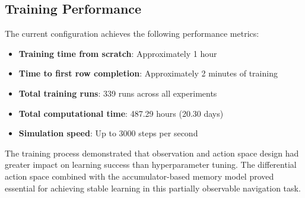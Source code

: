 \documentclass[11pt,a4paper,twocolumn]{article}
\begin{document}
\subsection{Training Performance}
The current configuration achieves the following performance metrics:
\begin{itemize}
    \item \textbf{Training time from scratch}: Approximately 1 hour
    \item \textbf{Time to first row completion}: Approximately 2 minutes of training
    \item \textbf{Total training runs}: 339 runs across all experiments
    \item \textbf{Total computational time}: 487.29 hours (20.30 days)
    \item \textbf{Simulation speed}: Up to 3000 steps per second
\end{itemize}

The training process demonstrated that observation and action space design had greater impact on learning success than hyperparameter tuning. The differential action space combined with the accumulator-based memory model proved essential for achieving stable learning in this partially observable navigation task.
\end{document}
